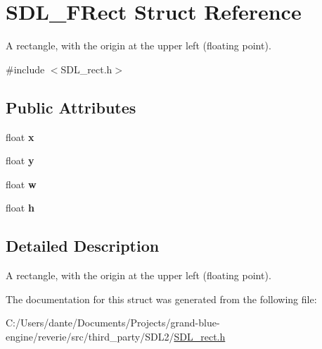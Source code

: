 \hypertarget{struct_s_d_l___f_rect}{}\section{S\+D\+L\+\_\+\+F\+Rect Struct Reference}
\label{struct_s_d_l___f_rect}


A rectangle, with the origin at the upper left (floating point).  




{\ttfamily \#include $<$S\+D\+L\+\_\+rect.\+h$>$}

\subsection*{Public Attributes}
\begin{DoxyCompactItemize}
\item 
\mbox{\label{struct_s_d_l___f_rect_a7dff6b929b472aa0c3989bec52bd01e0}} 
float {\bfseries x}
\item 
\mbox{\label{struct_s_d_l___f_rect_a9c7105750c0b4b1d27ee86ecd29835b3}} 
float {\bfseries y}
\item 
\mbox{\label{struct_s_d_l___f_rect_a8be19bcef20d0dc94302bfc092583bd7}} 
float {\bfseries w}
\item 
\mbox{\label{struct_s_d_l___f_rect_a23dacbd4579fa5a425435124b197a183}} 
float {\bfseries h}
\end{DoxyCompactItemize}


\subsection{Detailed Description}
A rectangle, with the origin at the upper left (floating point). 

The documentation for this struct was generated from the following file\+:\begin{DoxyCompactItemize}
\item 
C\+:/\+Users/dante/\+Documents/\+Projects/grand-\/blue-\/engine/reverie/src/third\+\_\+party/\+S\+D\+L2/\mbox{\hyperlink{_s_d_l__rect_8h}{S\+D\+L\+\_\+rect.\+h}}\end{DoxyCompactItemize}
